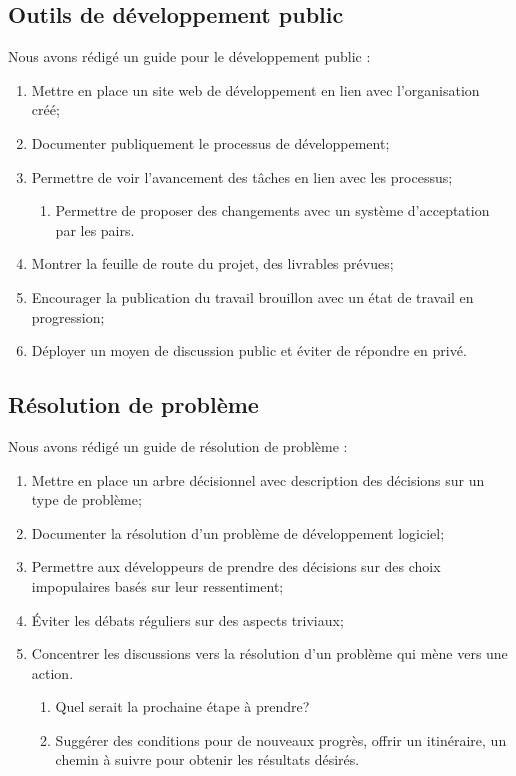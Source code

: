 \subsection{Outils de développement public}

Nous avons rédigé un guide pour le développement public :
\begin{enumerate}
    \item Mettre en place un site web de développement en lien avec l'organisation créé;
    \item Documenter publiquement le processus de développement;
    \item Permettre de voir l'avancement des tâches en lien avec les processus;
    \begin{enumerate}
        \item Permettre de proposer des changements avec un système d'acceptation par les pairs.
    \end{enumerate}
    \item Montrer la feuille de route du projet, des livrables prévues;
    \item Encourager la publication du travail brouillon avec un état de travail en progression;
    \item Déployer un moyen de discussion public et éviter de répondre en privé.
\end{enumerate}

\subsection{Résolution de problème}

Nous avons rédigé un guide de résolution de problème : 

\begin{enumerate}
    \item Mettre en place un arbre décisionnel avec description des décisions sur un type de problème;
    \item Documenter la résolution d'un problème de développement logiciel;
    \item Permettre aux développeurs de prendre des décisions sur des choix impopulaires basés sur leur ressentiment;
    \item Éviter les débats réguliers sur des aspects triviaux;
    \item Concentrer les discussions vers la résolution d'un problème qui mène vers une action.
    \begin{enumerate}
        \item Quel serait la prochaine étape à prendre?
        \item Suggérer des conditions pour de nouveaux progrès, offrir un itinéraire, un chemin à suivre pour obtenir les résultats désirés.
    \end{enumerate}
\end{enumerate}

